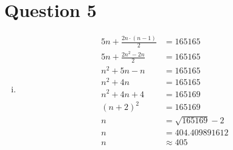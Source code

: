 \documentclass[12pt]{article}
\begin{document}
\section*{Question 5}
    \begin{enumerate}[i)]
        \item
        \begin{align*}
            5n + \frac{2n \cdot (n - 1)}{2} &= 165165 \\
            5n + \frac{2n^2 - 2n}{2} &= 165165 \\
            n^2 + 5n - n &= 165165 \\
            n^2 + 4n &= 165165 \\
            n^2 + 4n + 4 &= 165169 \\
            (n + 2)^2 &= 165169 \\
            n &= \sqrt{165169} - 2 \\
            n &= 404.409891612 \\
            n &\approx 405
        \end{align*}
    \end{enumerate}
\end{document}
